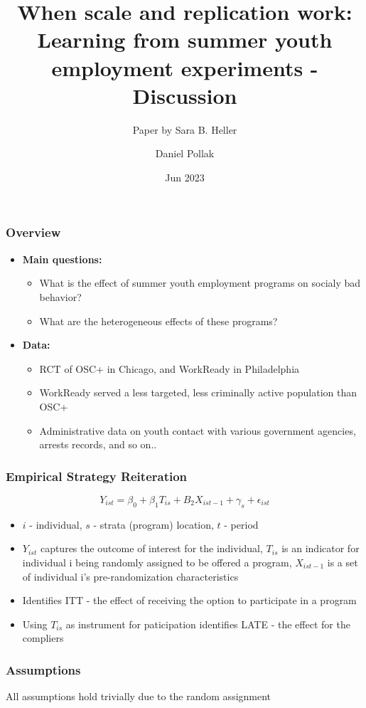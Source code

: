 \documentclass{beamer}
\title[Eco B] %
{When scale and replication work: Learning from summer youth
employment experiments - Discussion}
\subtitle{Paper by Sara B. Heller}
\author %
{Daniel Pollak}
\institute[TAU] %
{
  Tel-Aviv University
}
\date{Jun 2023}
\begin{document}
\frame{\titlepage}

\begin{frame}
\frametitle{Overview}
\begin{itemize}
  \item \textbf{Main questions:}
  \begin{itemize}
    \item What is the effect of summer youth employment programs on socialy bad behavior?
    \item What are the heterogeneous effects of these programs?
  \end{itemize}
  \item \textbf{Data:}
  \begin{itemize}
    \item RCT of OSC+ in Chicago, and WorkReady in Philadelphia
    \item WorkReady served a less targeted, less criminally active population than OSC+
    \item Administrative data on youth
    contact with various government agencies, arrests records, and so on..
  \end{itemize}
\end{itemize}

\end{frame}

\begin{frame}
\frametitle{Empirical Strategy Reiteration}
$$Y_{ist}=\beta_0+\beta_1T_{is}+B_2X_{ist-1}+\gamma_s+\epsilon_{ist}$$
\begin{itemize}
  \item $i$ - individual, $s$ - strata (program) location, $t$ - period
  \item $Y_{ist}$ captures the outcome of interest for the individual, $T_{is}$ is an indicator for individual i being randomly assigned to be offered a program, $X_{ist-1}$ is a set of
  individual i’s pre-randomization characteristics
  \item Identifies ITT - the effect of receiving the option to participate in a program
  \item Using $T_{is}$ as instrument for paticipation identifies LATE - the effect for the compliers
\end{itemize}
\end{frame}

\begin{frame}
  \frametitle{Assumptions}
  All assumptions hold trivially due to the random assignment
\end{frame}
\end{document}
